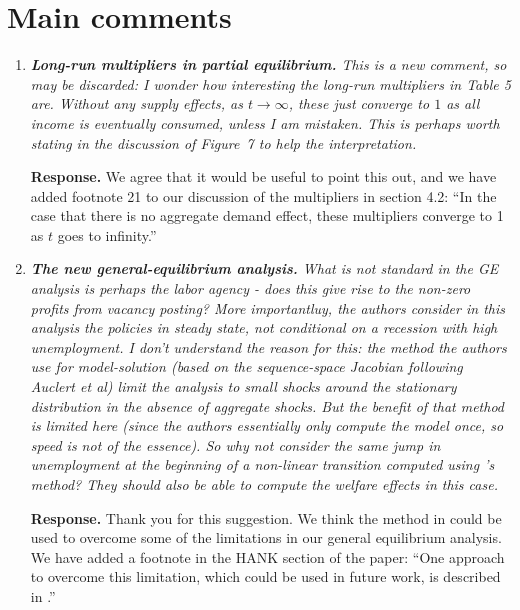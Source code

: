 \documentclass[12pt,letterpaper,english]{article}
\begin{document}
\section*{Main comments}
\begin{enumerate}[label=(\alph*)]
	\item \textit{\textbf{Long-run multipliers in partial equilibrium.} This is a new comment, so
		may be discarded: I wonder how interesting the long-run multipliers	in Table 5 are. Without any supply effects, as $t \rightarrow \infty$, these just converge to $1$ as all income is eventually consumed, unless I am mistaken. This is perhaps worth stating in the discussion of Figure~7 to help the interpretation.}
	
	\noindent \textbf{Response.} We agree that it would be useful to point this out, and we have added footnote 21 to our discussion of the multipliers in section 4.2: ``In the case that there is no aggregate demand effect, these multipliers converge to 1 as $t$ goes to infinity.''
	
	\item \textit{\textbf{The new general-equilibrium analysis.} What is not standard in the GE analysis is perhaps the labor agency - does this give rise to the non-zero profits from vacancy posting? More importantluy, the authors consider in this analysis the policies in steady state, not conditional	on a recession with high unemployment. I don't understand the reason for this: the method the authors use for model-solution (based on the sequence-space Jacobian following Auclert et al) limit the analysis to small shocks around the stationary distribution in the absence of aggregate shocks. But the benefit of that method is	limited here (since the authors essentially only compute the model once, so speed is not of the essence). So why not consider the same jump in unemployment at the beginning of a non-linear transition computed using \citet{boppart2018exploiting}'s method? They should also be able to compute the welfare effects in this case.}
	
	\noindent \textbf{Response.} Thank you for this suggestion. We think the method in \citet{boppart2018exploiting} could be used to overcome some of the limitations in our general equilibrium analysis. We have added a footnote in the HANK section of the paper: ``One approach to overcome this limitation, which could be used in future work, is described in \cite{boppart2018exploiting}.''
\end{enumerate}

\bigskip
\newpage
\end{document}
